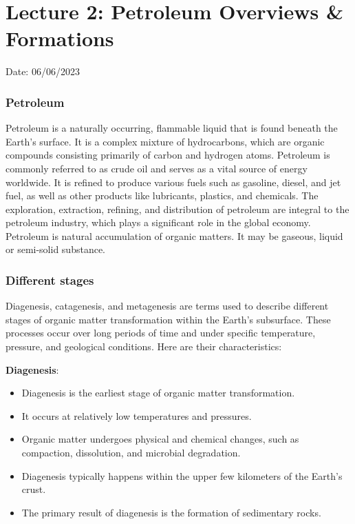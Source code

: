 \documentclass{article}
\begin{document}
\section{Lecture 2: Petroleum Overviews \& Formations}
\hfill Date: 06/06/2023

\subsubsection*{Petroleum}
Petroleum is a naturally occurring, flammable liquid that is found beneath the Earth's surface. It is a complex mixture of hydrocarbons, which are organic compounds consisting primarily of carbon and hydrogen atoms. Petroleum is commonly referred to as crude oil and serves as a vital source of energy worldwide. It is refined to produce various fuels such as gasoline, diesel, and jet fuel, as well as other products like lubricants, plastics, and chemicals. The exploration, extraction, refining, and distribution of petroleum are integral to the petroleum industry, which plays a significant role in the global economy.\\
Petroleum is natural accumulation of organic matters. It may be gaseous, liquid or semi-solid substance. 

\subsubsection*{Different stages}
Diagenesis, catagenesis, and metagenesis are terms used to describe different stages of organic matter transformation within the Earth's subsurface. These processes occur over long periods of time and under specific temperature, pressure, and geological conditions. Here are their characteristics:

\textbf{Diagenesis}:
    \begin{itemize}
        \item Diagenesis is the earliest stage of organic matter transformation.
        \item It occurs at relatively low temperatures and pressures.
        \item Organic matter undergoes physical and chemical changes, such as compaction, dissolution, and microbial degradation.
        \item Diagenesis typically happens within the upper few kilometers of the Earth's crust.
        \item The primary result of diagenesis is the formation of sedimentary rocks.
    \end{itemize}
\end{document}
